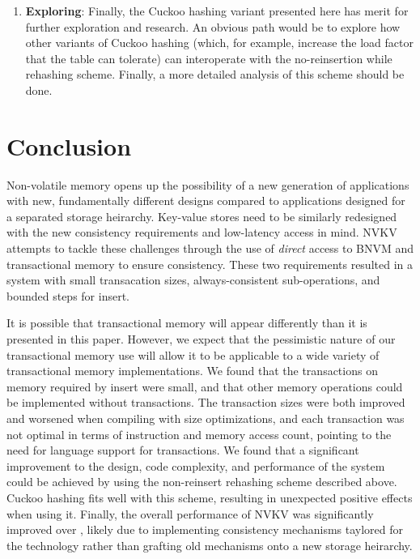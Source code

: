 \begin{enumerate}
\item \textbf{Exploring}: Finally, the Cuckoo hashing variant presented here has
merit for further exploration and research. An obvious path would be to explore
how other variants of Cuckoo hashing (which, for example, increase the load factor that
the table can tolerate) can interoperate with the no-reinsertion while rehashing
scheme. Finally, a more detailed analysis of this scheme should be done.

\end{enumerate}

\section{Conclusion}

Non-volatile memory opens up the possibility of a new generation of applications
with new, fundamentally different designs compared to applications designed for
a separated storage heirarchy. Key-value stores need to be similarly redesigned
with the new consistency requirements and low-latency access in mind. NVKV
attempts to tackle these challenges through the use of \textit{direct} access to
BNVM and transactional memory to ensure consistency. These two requirements
resulted in a system with small transacation sizes, always-consistent
sub-operations, and bounded steps for insert.

It is possible that transactional memory will appear differently than it is
presented in this paper. However, we expect that the pessimistic nature of our
transactional memory use will allow it to be applicable to a wide variety of
transactional memory implementations. We found that the transactions on memory
required by insert were small, and that other memory operations could be
implemented without transactions. The transaction sizes were both improved and
worsened when compiling with size optimizations, and each transaction was not
optimal in terms of instruction and memory access count, pointing to the need
for language support for transactions. We found that a significant improvement
to the design, code complexity, and performance of the system could be
achieved by using the non-reinsert rehashing scheme described above. Cuckoo
hashing fits well with this scheme, resulting in unexpected positive effects
when using it. Finally, the overall performance of NVKV was significantly
improved over \bdb, likely due to implementing consistency mechanisms taylored
for the technology rather than grafting old mechanisms onto a new storage heirarchy.



